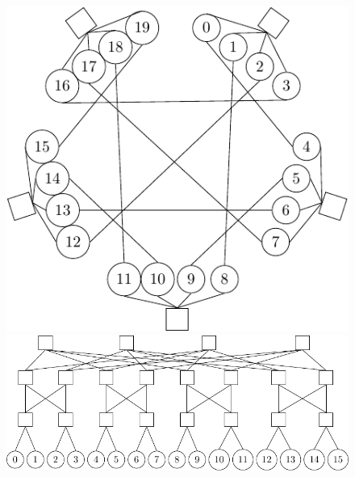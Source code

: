 \begin{figure}[t]
    \begin{minipage}{0.82\columnwidth}
        \centering
        \includegraphics[width=1\textwidth]{figures/topologies/dcell-crop}
    \end{minipage}\hfill
    \begin{minipage}{.95\columnwidth}
        \includegraphics[width=\textwidth]{figures/topologies/fattree}

        \vspace{2.5em}


\end{minipage}
\end{figure}
